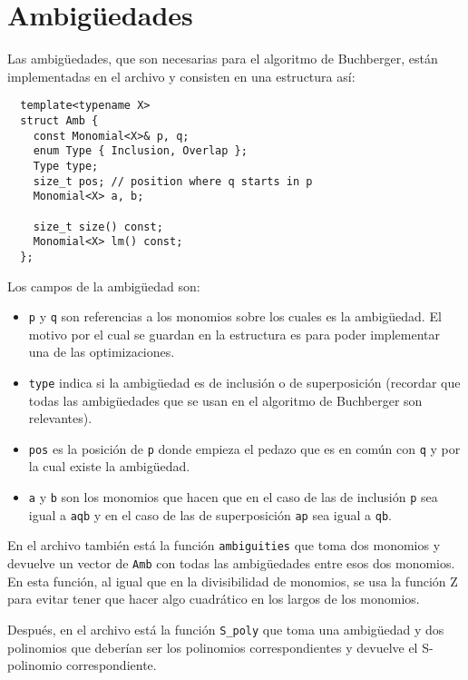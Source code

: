 \documentclass[12pt]{report}
\theoremstyle{customstyle}
\theoremstyle{factstyle}
\begin{document}
\section{Ambigüedades}

Las ambigüedades, que son necesarias para el algoritmo de Buchberger, están implementadas en el archivo  y consisten en una estructura así:

\begin{verbatim}
  template<typename X>
  struct Amb {
    const Monomial<X>& p, q;
    enum Type { Inclusion, Overlap };
    Type type;
    size_t pos; // position where q starts in p
    Monomial<X> a, b;

    size_t size() const;
    Monomial<X> lm() const;
  };
\end{verbatim}

Los campos de la ambigüedad son:

\begin{itemize}
  \item \texttt{p} y \texttt{q} son referencias a los monomios sobre los cuales es la ambigüedad. El motivo por el cual se guardan en la estructura es para poder implementar una de las optimizaciones.
  \item \texttt{type} indica si la ambigüedad es de inclusión o de superposición (recordar que todas las ambigüedades que se usan en el algoritmo de Buchberger son relevantes).
  \item \texttt{pos} es la posición de \texttt{p} donde empieza el pedazo que es en común con \texttt{q} y por la cual existe la ambigüedad.
  \item \texttt{a} y \texttt{b} son los monomios que hacen que en el caso de las de inclusión \texttt{p} sea igual a \texttt{aqb} y en el caso de las de superposición \texttt{ap} sea igual a \texttt{qb}. %
\end{itemize}

En el archivo también está la función \texttt{ambiguities} que toma dos monomios y devuelve un vector de \texttt{Amb} con todas las ambigüedades entre esos dos monomios. En esta función, al igual que en la divisibilidad de monomios, se usa la función Z para evitar tener que hacer algo cuadrático en los largos de los monomios.

Después, en el archivo está la función \texttt{S\_poly} que toma una ambigüedad y dos polinomios que deberían ser los polinomios correspondientes y devuelve el S-polinomio correspondiente.
\end{document}
